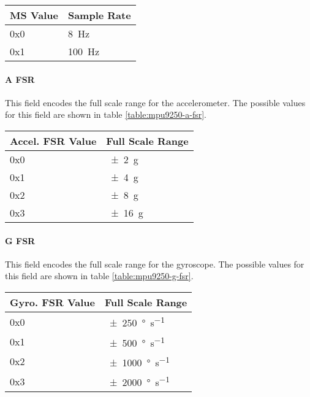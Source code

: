 \begin{table*}[htb]
    \centering
    \begin{tabular}{@{}ll@{}}
        \toprule
        MS Value & Sample Rate        \\
        \midrule
        0x0      & {\SI{8}{\hertz}}   \\
        0x1      & {\SI{100}{\hertz}} \\
        \bottomrule
    \end{tabular}
    \caption{MPU9250 Magnetometer Sample Rate Values}
    \label{table:mpu9250-mag-odr}
\end{table*}

\paragraph{A FSR}
This field encodes the full scale range for the accelerometer. The possible values for this field are shown in table
\ref{table:mpu9250-a-fsr}.

\begin{table*}[htb]
    \centering
    \begin{tabular}{@{}ll@{}}
        \toprule
        Accel. FSR Value & Full Scale Range \\
        \midrule
        0x0              & {\SI{\pm 2}{g}}  \\
        0x1              & {\SI{\pm 4}{g}}  \\
        0x2              & {\SI{\pm 8}{g}}  \\
        0x3              & {\SI{\pm 16}{g}} \\
        \bottomrule
    \end{tabular}
    \caption{MPU9250 Accelerometer Full Scale Range Values}
    \label{table:mpu9250-a-fsr}
\end{table*}

\paragraph{G FSR}
This field encodes the full scale range for the gyroscope. The possible values for this field are shown in table
\ref{table:mpu9250-g-fsr}.

\begin{table*}[htb]
    \centering
    \begin{tabular}{@{}ll@{}}
        \toprule
        Gyro. FSR Value & Full Scale Range                    \\
        \midrule
        0x0             & {\SI{\pm 250}{\degree\per\second}}  \\
        0x1             & {\SI{\pm 500}{\degree\per\second}}  \\
        0x2             & {\SI{\pm 1000}{\degree\per\second}} \\
        0x3             & {\SI{\pm 2000}{\degree\per\second}} \\
        \bottomrule
    \end{tabular}
    \caption{MPU9250 Gyroscope Full Scale Range Values}
    \label{table:mpu9250-g-fsr}
\end{table*}

